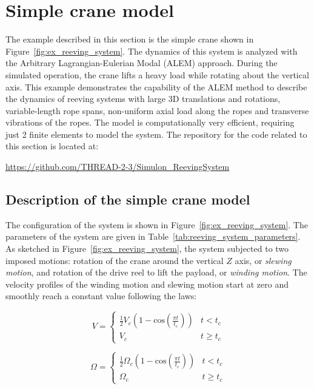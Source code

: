 \section{Simple crane model}\label{sec:craneSimulon}
The example described in this section is the simple crane shown in Figure~\ref{fig:ex_reeving_system}. The dynamics of this system is analyzed with the Arbitrary Lagrangian-Eulerian Modal (ALEM) approach. During the simulated operation, the crane lifts a heavy load while rotating about the vertical axis. This example demonstrates the capability of the ALEM method to describe the dynamics of reeving systems with large 3D translations and rotations, variable-length rope spans, non-uniform axial load along the ropes and transverse vibrations of the ropes. The model is computationally very efficient, requiring just 2 finite elements to model the system. The repository for the code related to this section is located at:
\bi
  \item[] \url{https://github.com/THREAD-2-3/Simulon_ReevingSystem}
\ei

\subsection{Description of the simple crane model}
The configuration of the system is shown in Figure~\ref{fig:ex_reeving_system}. The parameters of the system are given in Table~\ref{tab:reeving_system_parameters}. As sketched in Figure~\ref{fig:ex_reeving_system}, the system subjected to two imposed motions: rotation of the crane around the vertical $Z$ axis, or \textit{slewing motion}, and rotation of the drive reel to lift the payload, or \textit{winding motion}. The velocity profiles of the winding motion and slewing motion start at zero and smoothly reach a constant value following the laws: 

\begin{equation}
V = \left\{ {\begin{array}{*{20}{c}}
\frac{1}{2}V_c(1-\text{cos}(\frac{\pi t}{t_c}))&t < t_c\\
V_c&t \ge t_c
\end{array}} \right.
 \label{eq:rotation_angle}
\end{equation}


\begin{equation}
\Omega = \left\{ {\begin{array}{*{20}{c}}
\frac{1}{2}\Omega_c(1-\text{cos}(\frac{\pi t}{t_c}))&t < t_c\\
\Omega_c&t \ge t_c
\end{array}} \right.
 \label{eq:rotation_angle}
\end{equation}


